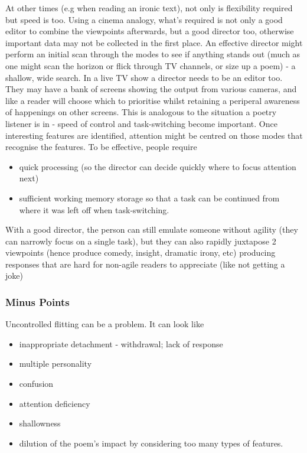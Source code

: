 \documentclass[11pt]{article}
\begin{document}
At other times (e.g when reading an ironic text),
  not only is flexibility required 
but speed is too. Using a cinema analogy,
what's required is not only a good editor to combine the viewpoints afterwards, but
a good director too, otherwise important data may not be
collected in the first place. An effective director might perform an
initial scan through the modes to see if anything stands out (much as one
might scan the horizon or flick through TV channels, or size up a poem) - a
  shallow, wide search. In a live TV show a director needs to be an editor
  too. They may have a bank of
  screens showing the output from various cameras, and like a reader will
choose which to prioritise whilst retaining a periperal awareness of
happenings on other screens. This is analogous to the situation a poetry
listener is in - speed of control and task-switching become important. 
Once interesting
features are identified, attention might be centred on those modes that
recognise the features. To be effective, people require
\begin{itemize}
\item quick processing (so
the director can decide quickly where to focus attention next)
\item sufficient working memory storage so that a task can be continued from where it
was left off when task-switching.
\end{itemize}


With a good director, the person can still emulate someone without agility
(they can narrowly focus on a single task), but they can also rapidly
juxtapose 2 viewpoints (hence produce comedy, insight, dramatic irony, etc)
producing responses that 
are hard for non-agile readers to appreciate (like not getting a joke)


\subsubsection*{Minus Points}


Uncontrolled flitting can be a problem. It can
look like
\begin{itemize}
\item  inappropriate detachment - withdrawal; lack of response
\item  multiple personality
\item  confusion
\item  attention deficiency
\item  shallowness
\item  dilution of the poem's impact by considering too many types
of features.
\end{itemize}
\end{document}
